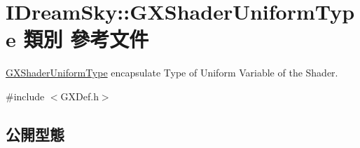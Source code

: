 \hypertarget{class_i_dream_sky_1_1_g_x_shader_uniform_type}{}\section{I\+Dream\+Sky\+:\+:G\+X\+Shader\+Uniform\+Type 類別 參考文件}
\label{class_i_dream_sky_1_1_g_x_shader_uniform_type}


\hyperlink{class_i_dream_sky_1_1_g_x_shader_uniform_type}{G\+X\+Shader\+Uniform\+Type} encapsulate Type of Uniform Variable of the Shader.  




{\ttfamily \#include $<$G\+X\+Def.\+h$>$}

\subsection*{公開型態}
